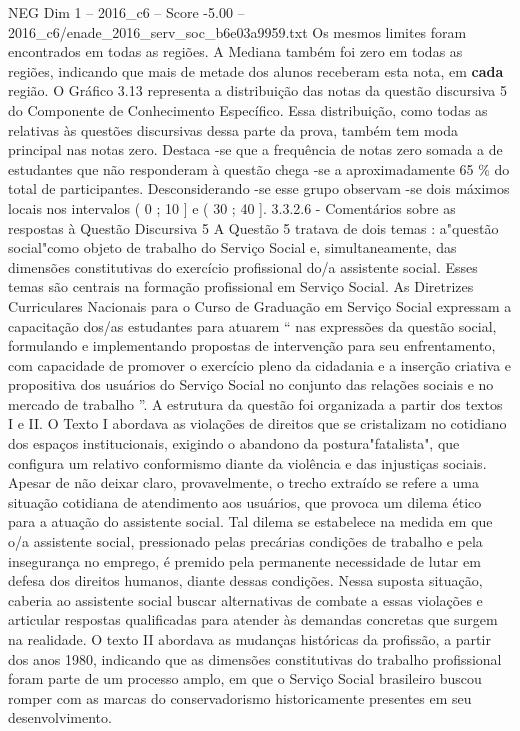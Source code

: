 \begin{textsample}{NEG Dim 1 – 2016\_c6 – Score -5.00 – 2016\_c6/enade\_2016\_serv\_soc\_b6e03a9959.txt}
Os mesmos limites foram encontrados em todas as regiões.
A Mediana também foi zero em todas as regiões, indicando que mais de metade dos alunos receberam esta nota, em \textbf{cada} região.
O Gráfico 3.13 representa a distribuição das notas da questão discursiva 5 do Componente de Conhecimento Específico.
Essa distribuição, como todas as relativas às questões discursivas dessa parte da prova, também tem moda principal nas notas zero.
Destaca -se que a frequência de notas zero somada a de estudantes que não responderam à questão chega -se a aproximadamente 65 \% do total de participantes.
Desconsiderando -se esse grupo observam -se dois máximos locais nos intervalos ( 0 ; 10 ] e ( 30 ; 40 ]. 3.3.2.6 - Comentários sobre as respostas à Questão Discursiva 5 A Questão 5 tratava de dois temas : a"questão social"como objeto de trabalho do Serviço Social e, simultaneamente, das dimensões constitutivas do exercício profissional do/a assistente social.
Esses temas são centrais na formação profissional em Serviço Social.
As Diretrizes Curriculares Nacionais para o Curso de Graduação em Serviço Social expressam a capacitação dos/as estudantes para atuarem “ nas expressões da questão social, formulando e implementando propostas de intervenção para seu enfrentamento, com capacidade de promover o exercício pleno da cidadania e a inserção criativa e propositiva dos usuários do Serviço Social no conjunto das relações sociais e no mercado de trabalho ”.
A estrutura da questão foi organizada a partir dos textos I e II.
O Texto I abordava as violações de direitos que se cristalizam no cotidiano dos espaços institucionais, exigindo o abandono da postura"fatalista", que configura um relativo conformismo diante da violência e das injustiças sociais.
Apesar de não deixar claro, provavelmente, o trecho extraído se refere a uma situação cotidiana de atendimento aos usuários, que provoca um dilema ético para a atuação do assistente social.
Tal dilema se estabelece na medida em que o/a assistente social, pressionado pelas precárias condições de trabalho e pela insegurança no emprego, é premido pela permanente necessidade de lutar em defesa dos direitos humanos, diante dessas condições.
Nessa suposta situação, caberia ao assistente social buscar alternativas de combate a essas violações e articular respostas qualificadas para atender às demandas concretas que surgem na realidade.
O texto II abordava as mudanças históricas da profissão, a partir dos anos 1980, indicando que as dimensões constitutivas do trabalho profissional foram parte de um processo amplo, em que o Serviço Social brasileiro buscou romper com as marcas do conservadorismo historicamente presentes em seu desenvolvimento.

\end{textsample}
